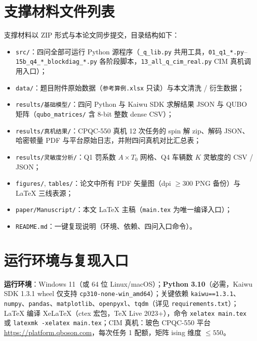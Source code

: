 \documentclass[UTF8,12pt,a4paper]{ctexart}
\begin{document}
\appendix
{}

\section{支撑材料文件列表}
\label{app:files}

支撑材料以 ZIP 形式与本论文同步提交，目录结构如下：

\begin{itemize}
  \item \texttt{src/}：四问全部可运行 Python 源程序（\texttt{\_q\_lib.py} 共用工具，\texttt{01\_q1\_*.py}--\texttt{15b\_q4\_*\_blockdiag\_*.py} 各阶段脚本，\texttt{13\_all\_q\_cim\_real.py} CIM 真机调用入口）；
  \item \texttt{data/}：题目附件原始数据（\texttt{参考算例.xlsx} 只读）与本文清洗 / 衍生数据；
  \item \texttt{results/基础模型/}：四问 Python 与 Kaiwu SDK 求解结果 JSON 与 QUBO 矩阵（\texttt{qubo\_matrices/} 含 8-bit 整数 dense CSV）；
  \item \texttt{results/真机结果/}：CPQC-550 真机 12 次任务的 spin 解 zip、解码 JSON、哈密顿量 PDF 与平台原始日志，并附四问真机对比汇总表；
  \item \texttt{results/灵敏度分析/}：Q1 罚系数 $A\!\times\!T_0$ 网格、Q4 车辆数 $K$ 灵敏度的 CSV / JSON；
  \item \texttt{figures/}, \texttt{tables/}：论文中所有 PDF 矢量图（dpi $\ge 300$ PNG 备份）与 LaTeX 三线表源；
  \item \texttt{paper/Manuscript/}：本文 LaTeX 主稿（\texttt{main.tex} 为唯一编译入口）；
  \item \texttt{README.md}：一键复现说明（环境、依赖、四问入口命令）。
\end{itemize}

\section{运行环境与复现入口}
\label{app:env}

\textbf{运行环境}：Windows 11（或 64 位 Linux/macOS）；\textbf{Python 3.10}（必需，Kaiwu SDK 1.3.1 wheel 仅支持 \texttt{cp310-none-win\_amd64}）；关键依赖 \texttt{kaiwu==1.3.1}、\texttt{numpy}、\texttt{pandas}、\texttt{matplotlib}、\texttt{openpyxl}、\texttt{tqdm}（详见 \texttt{requirements.txt}）；LaTeX 编译 XeLaTeX（ctex 宏包，TeX Live 2023+），命令 \texttt{xelatex main.tex} 或 \texttt{latexmk -xelatex main.tex}；CIM 真机：玻色 CPQC-550 平台 \url{https://platform.qboson.com}，每次任务 1 配额，矩阵 ising 维度 $\le 550$。
\end{document}
